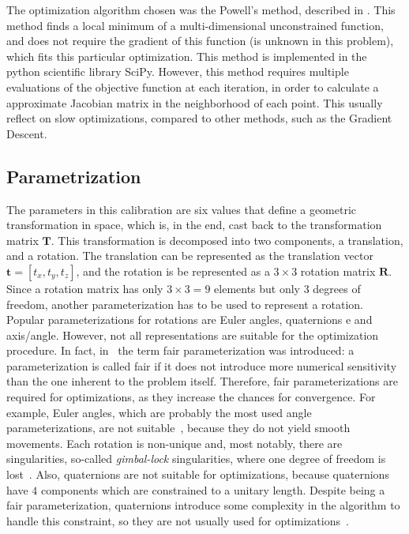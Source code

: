 \documentclass[conference]{IEEEtran}
\begin{document}
The optimization algorithm chosen was the Powell's method, described in \cite{powell64}. This method finds a local minimum of a multi-dimensional unconstrained function, and does not require the gradient of this function (is unknown in this problem), which fits this particular optimization. This method is implemented in the python scientific library SciPy. However, this method requires multiple evaluations of the objective function at each iteration, in order to calculate a approximate Jacobian matrix in the neighborhood of each point. This usually reflect on slow optimizations, compared to other methods, such as the Gradient Descent.

\subsection{Parametrization}

The parameters in this calibration are six values that define a geometric transformation in space, which is, in the end, cast back to the transformation matrix $\bm{T}$. This transformation is decomposed into two components, a translation, and a rotation. The translation can be represented as the translation vector $\mathbf{t} = \left[t_x, t_y, t_z\right]$, and the rotation is be represented as a $3 \times 3$ rotation matrix $\bm{R}$. Since a rotation matrix has only $3 \times 3 = 9$ elements but only 3 degrees of freedom, another parameterization has to be used to represent a rotation. Popular parameterizations for rotations are Euler angles, quaternions e and axis/angle. However, not all representations are suitable for the optimization procedure. In fact, in~\cite{hornegger99} the term fair parameterization was introduced: a parameterization is called fair if it does not introduce more numerical sensitivity than the one inherent to the problem itself. Therefore, fair parameterizations are required for optimizations, as they increase the chances for convergence. For example, Euler angles, which are probably the most used angle parameterizations, are not suitable~\cite{schmidt01}, because they do not yield smooth movements. Each rotation is non-unique and, most notably, there are singularities, so-called \textit{gimbal-lock} singularities, where one degree of freedom is lost~\cite{schmidt01}. Also, quaternions are not suitable for optimizations, because quaternions have $4$ components which are constrained to a unitary length. Despite being a fair parameterization, quaternions introduce some complexity in the algorithm to handle this constraint, so they are not usually used for optimizations~\cite{schmidt01}.
\end{document}
